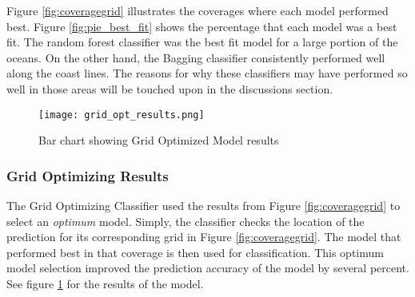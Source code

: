 \par
Figure \ref{fig:coveragegrid} illustrates the coverages where each model performed best.
Figure \ref{fig:pie_best_fit} shows the percentage that each model was a best fit.
The random forest classifier was the best fit model for a large portion of the oceans.
On the other hand, the Bagging classifier consistently performed well along the coast lines.
The reasons for why these classifiers may have performed so well in those areas will be touched upon in the discussions section.


\begin{figure}[htp]
    \centering
    \texttt{[image: grid\_opt\_results.png]}
    \caption{Bar chart showing Grid Optimized Model results}
    \label{fig:grid_opt_barplot}
\end{figure}
\subsubsection{Grid Optimizing Results}
The Grid Optimizing Classifier used the results from Figure \ref{fig:coveragegrid} to select an \textit{optimum} model.
Simply, the classifier checks the location of the prediction for its corresponding grid in Figure \ref{fig:coveragegrid}.
The model that performed best in that coverage is then used for classification.
This optimum model selection improved the prediction accuracy of the model by several percent.
See figure \ref{fig:grid_opt_barplot} for the results of the model.


